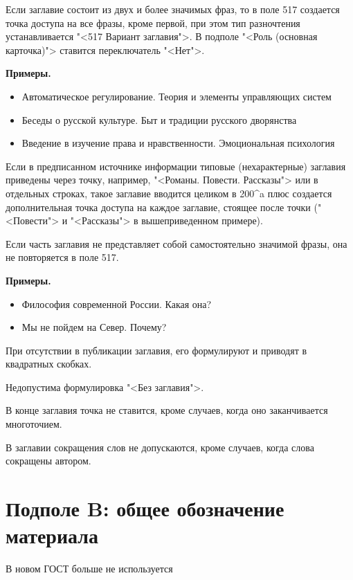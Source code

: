 Если заглавие состоит из двух и более значимых фраз, то в поле 517 создается точка доступа на все фразы, кроме первой, при этом тип разночтения устанавливается "<517 Вариант заглавия">. В подполе "<Роль (основная карточка)"> ставится переключатель "<Нет">.

\textbf{Примеры.}

\begin{itemize}
	\item Автоматическое регулирование. Теория и элементы управляющих систем
	\item Беседы о русской культуре. Быт и традиции русского дворянства
	\item Введение в изучение права и нравственности. Эмоциональная психология 
\end{itemize}

Если в предписанном источнике информации типовые (нехарактерные) заглавия приведены через точку, например, "<Романы. Повести. Рассказы"> или в отдельных строках, такое заглавие вводится целиком в 200\^{}a плюс создается дополнительная точка доступа на каждое заглавие, стоящее после точки ("<Повести"> и "<Рассказы"> в вышеприведенном примере).

Если часть заглавия не представляет собой самостоятельно значимой фразы, она не повторяется в поле 517.

\textbf{Примеры.}

\begin{itemize}
	\item Философия современной России. Какая она?
	\item Мы не пойдем на Север. Почему?
\end{itemize}

При отсутствии в публикации заглавия, его формулируют и приводят в квадратных скобках.

Недопустима формулировка "<Без заглавия">.

В конце заглавия точка не ставится, кроме случаев, когда оно заканчивается многоточием.

В заглавии сокращения слов не допускаются, кроме случаев, когда слова сокращены автором.


\section{Подполе B: общее обозначение материала}

{\color{red}В новом ГОСТ больше не используется}

